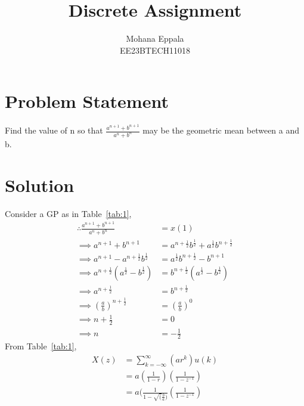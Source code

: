 \documentclass[12pt]{article}
\newcommand{\tabref}[1]{Table~\ref{#1}}
\begin{document}
\title{Discrete Assignment}
\author{Mohana Eppala\\ EE23BTECH11018}
\maketitle

\section*{Problem Statement}
Find the value of n so that $\frac{a^{n+1} + b^{n+1}}{a^{n}+b^{n}}$ may be the geometric mean between a and b.
\section{Solution}

\begin{table}[H]

\end{table}

Consider a GP as in \tabref{tab:1},
\begin{align}
	\therefore \frac{a^{n+1} + b^{n+1}}{a^{n}+b^{n}} &= x(1) \\
	\implies a^{n+1} + b^{n+1} &= a^{n+\frac{1}{2}}b^{\frac{1}{2}} + a^{\frac{1}{2}}b^{n+\frac{1}{2}} \\ 
\implies a^{n+1} - a^{n+\frac{1}{2}}b^{\frac{1}{2}} &=  a^{\frac{1}{2}}b^{n+\frac{1}{2}} - b^{n+1} \\ 
\implies a^{n+\frac{1}{2}}(a^{\frac{1}{2}} - b^{\frac{1}{2}}) &= b^{n+\frac{1}{2}}(a^{\frac{1}{2}} - b^{\frac{1}{2}}) \\     
\implies a^{n+\frac{1}{2}} &= b^{n+\frac{1}{2}} \\ 
\implies (\frac{a}{b})^{n+\frac{1}{2}} &= (\frac{a}{b})^{0} \\
\implies n + \frac{1}{2} &= 0 \\
\implies n &= -\frac{1}{2}
\end{align}
From \tabref{tab:1},
\begin{align}
	X(z) &= \sum_{k=-\infty}^{\infty} (ar^{k})u(k) \\
	&= a(\frac{1}{1-r})(\frac{1}{1-z^{-1}}) \\
	&= a(\frac{1}{1-\sqrt(\frac{b}{a})}(\frac{1}{1-z^{-1}})
\end{align}
\end{document}
